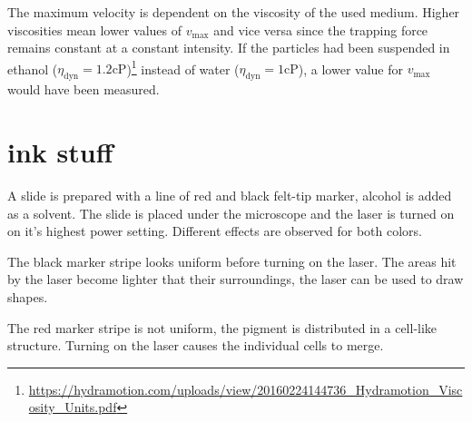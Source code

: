 The maximum velocity is dependent on the viscosity of the used medium.
Higher viscosities mean lower values of $v_\text{max}$ and vice versa since the trapping force remains constant at a constant intensity.
If the particles had been suspended in ethanol ($\eta_\text{dyn} = \num{1.2}\text{cP}$)\footnote{\label{ref:viscosity}\url{https://hydramotion.com/uploads/view/20160224144736_Hydramotion_Viscosity_Units.pdf}} instead of water ($\eta_\text{dyn} = \num{1}\text{cP}$), a lower value for $v_\text{max}$ would have been measured.
\section{ink stuff}
A slide is prepared with a line of red and black felt-tip marker, alcohol is added as a solvent.
The slide is placed under the microscope and the laser is turned on on it's highest power setting.
Different effects are observed for both colors.

The black marker stripe looks uniform before turning on the laser.
The areas hit by the laser become lighter that their surroundings, the laser can be used to draw shapes.

The red marker stripe is not uniform, the pigment is distributed in a cell-like structure.
Turning on the laser causes the individual cells to merge.

